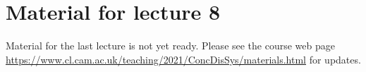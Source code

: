 






\section{Material for lecture 8}


Material for the last lecture is not yet ready.
Please see the course web page \url{https://www.cl.cam.ac.uk/teaching/2021/ConcDisSys/materials.html} for updates.

\footnotesize

{}

